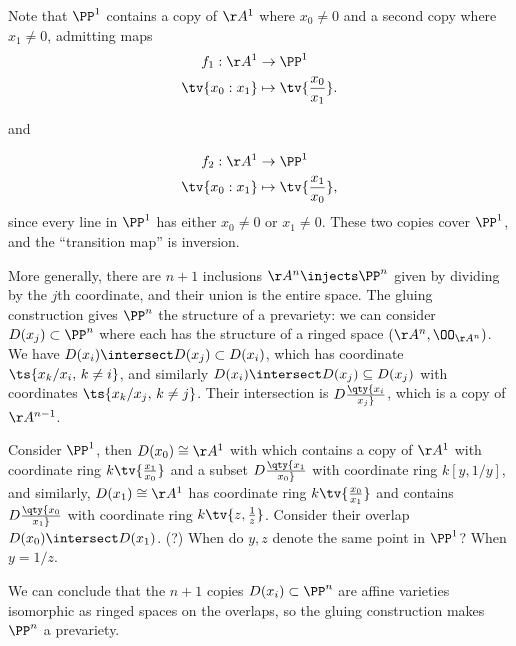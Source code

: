 \begin{example}[?]

Note that \(\PP^1\) contains a copy of \(\AA^1\) where \(x_0 \neq 0\)
and a second copy where \(x_1 \neq 0\), admitting maps
\begin{align*}  
f_1: \AA^1 &\to \PP^1 \\
\tv{x_0: x_1} &\mapsto \tv{{x_0 \over x_1}}
.\end{align*}

and

\begin{align*}  
f_2: \AA^1 &\to \PP^1 \\
\tv{x_0: x_1} &\mapsto \tv{{x_1 \over x_0}}
,\end{align*} since every line in \(\PP^1\) has either \(x_0\neq 0\) or
\(x_1 \neq 0\). These two copies cover \(\PP^1\), and the ``transition
map'' is inversion.

\end{example}

\begin{remark}

More generally, there are \(n+1\) inclusions \(\AA^n \injects \PP^n\)
given by dividing by the \(j\)th coordinate, and their union is the
entire space. The gluing construction gives \(\PP^n\) the structure of a
prevariety: we can consider \(D(x_j) \subset \PP^n\) where each has the
structure of a ringed space \((\AA^n, \OO_{\AA^n})\). We have
\(D(x_i) \intersect D(x_j) \subset D(x_i)\), which has coordinate
\(\ts{ x_k/x_i,\, k\neq i }\), and similarly
\(D(x_i) \intersect D(x_j) \subseteq D(x_j)\) with coordinates
\(\ts{ x_k/x_j, \, k\neq j}\). Their intersection is
\(D\qty{x_i \over x_j}\), which is a copy of \(\AA^{n-1}\).

\end{remark}

\begin{example}[?]

Consider \(\PP^1\), then \(D(x_0) \cong \AA^1\) with which contains a
copy of \(\AA^1\) with coordinate ring \(k\tv{{x_1\over x_0}}\) and a
subset \(D\qty{x_1\over x_0}\) with coordinate ring \(k[y, 1/y]\), and
similarly, \(D(x_1) \cong \AA^1\) has coordinate ring
\(k\tv{{x_0\over x_1}}\) and contains \(D\qty{x_0\over x_1}\) with
coordinate ring \(k\tv{z, {1\over z}}\). Consider their overlap
\(D(x_0) \intersect D(x_1)\). (?) When do \(y, z\) denote the same point
in \(\PP^1\)? When \(y = 1/z\).

We can conclude that the \(n+1\) copies \(D(x_i) \subset \PP^n\) are
affine varieties isomorphic as ringed spaces on the overlaps, so the
gluing construction makes \(\PP^n\) a prevariety.

\end{example}

